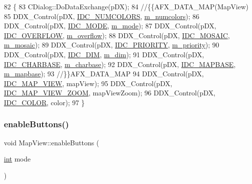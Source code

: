 \begin{DoxyCode}
82 \{
83   CDialog::DoDataExchange(pDX);
84   \textcolor{comment}{//\{\{AFX\_DATA\_MAP(MapView)}
85   DDX\_Control(pDX, \mbox{\hyperlink{resource_8h_a9e6aad4c0a4a41ed652210b2020b7978}{IDC\_NUMCOLORS}}, \mbox{\hyperlink{class_map_view_a211ea4eb337579e7193702ed2f20279c}{m\_numcolors}});
86   DDX\_Control(pDX, \mbox{\hyperlink{resource_8h_a496f68890fb20f445e7456d458757bf2}{IDC\_MODE}}, \mbox{\hyperlink{class_map_view_a9d3a6ede0046bc5a24b3472b59594056}{m\_mode}});
87   DDX\_Control(pDX, \mbox{\hyperlink{resource_8h_a87dcba41de19597c66c71e0fb198e73b}{IDC\_OVERFLOW}}, \mbox{\hyperlink{class_map_view_a594a0ff999a2dd22853a45b584325543}{m\_overflow}});
88   DDX\_Control(pDX, \mbox{\hyperlink{resource_8h_a1c27ccea83aee8ba8f8e36c29e58b540}{IDC\_MOSAIC}}, \mbox{\hyperlink{class_map_view_a382e8904120801584d23def0e73360f9}{m\_mosaic}});
89   DDX\_Control(pDX, \mbox{\hyperlink{resource_8h_a5f9b7ceb0787e6ae1dda7db9edd604d2}{IDC\_PRIORITY}}, \mbox{\hyperlink{class_map_view_a3b5211e836b2d9b0124e0bcb71a49c3c}{m\_priority}});
90   DDX\_Control(pDX, \mbox{\hyperlink{resource_8h_a4c2fd4837fd31d9fdb4ef9d3f33d5652}{IDC\_DIM}}, \mbox{\hyperlink{class_map_view_a78939f6f277c3e2b39292ecd4b21ca00}{m\_dim}});
91   DDX\_Control(pDX, \mbox{\hyperlink{resource_8h_a92a345ce422442a5a6bd681f6ba5450b}{IDC\_CHARBASE}}, \mbox{\hyperlink{class_map_view_ad1561bbb87fe21907a1df6085855d1b1}{m\_charbase}});
92   DDX\_Control(pDX, \mbox{\hyperlink{resource_8h_abaa4130147e520612bfd912f0ced570f}{IDC\_MAPBASE}}, \mbox{\hyperlink{class_map_view_a8f4a820c52aaffadc6132ccd7727aa9d}{m\_mapbase}});
93   \textcolor{comment}{//\}\}AFX\_DATA\_MAP}
94   DDX\_Control(pDX, \mbox{\hyperlink{resource_8h_a3e6bb424d55ccf9fed6fa557eba35488}{IDC\_MAP\_VIEW}}, mapView);
95   DDX\_Control(pDX, \mbox{\hyperlink{resource_8h_a623597a58dcab206815a2c2fc7de0d91}{IDC\_MAP\_VIEW\_ZOOM}}, mapViewZoom);
96   DDX\_Control(pDX, \mbox{\hyperlink{resource_8h_a611975b03b6d7ce68b2de260b97086d0}{IDC\_COLOR}}, color);
97 \}
\end{DoxyCode}
\mbox{\label{class_map_view_aad00c64b13ff280b4279a7f8cd57b083}} 
\subsubsection{\texorpdfstring{enable\+Buttons()}{enableButtons()}}
{\footnotesize\ttfamily void Map\+View\+::enable\+Buttons (\begin{DoxyParamCaption}\item[{\mbox{\hyperlink{_util_8cpp_a0ef32aa8672df19503a49fab2d0c8071}{int}}}]{mode }\end{DoxyParamCaption})}



